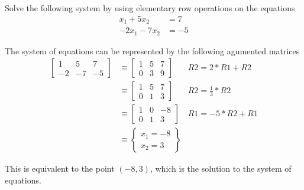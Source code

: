 \documentclass{../mathhomework}
\begin{document}
\maketitle

\pagebreak

\begin{problem}[1.1\#1]
    Solve the following system by using elementary row operations on the equations
    \begin{align*}
        x_1 + 5x_2 &= 7 \\
        -2x_1 - 7x_2 &= -5
    \end{align*}

    \begin{solution}
        The system of equations can be represented by the following agumented matrices
        \begin{align*}
            \begin{bmatrix}
                1 & 5 & 7 \\
                -2 & -7 & -5
            \end{bmatrix}
            & \equiv
            \begin{bmatrix}
                1 & 5 & 7 \\
                0 & 3 & 9
            \end{bmatrix}
            & R2 = 2 * R1 + R2 \\ & \equiv
            \begin{bmatrix}
                1 & 5 & 7 \\
                0 & 1 & 3
            \end{bmatrix}
            & R2 = \frac{1}{3} * R2 \\ & \equiv
            \begin{bmatrix}
                1 & 0 & -8 \\
                0 & 1 & 3
            \end{bmatrix}
            & R1 = -5 * R2 + R1 \\ & \equiv
            \begin{Bmatrix}
                x_1 = -8 \\
                x_2 = 3
            \end{Bmatrix}
        \end{align*}

        This is equivalent to the point $(-8, 3)$, which is the solution to the system of equations.
    \end{solution}
\end{problem}
\end{document}
